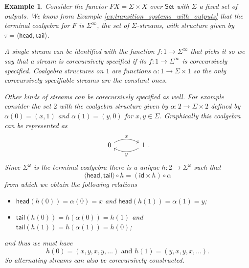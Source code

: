 \documentclass[letterpaper, 11pt, oneside]{memoir}
\theoremstyle{myteo}
\newtheorem{example}[theorem]{Example}
\numberwithin{equation}{section}
\newcommand{\id}{\textsf{id}}
\newcommand{\head}{\textsf{head}}
\newcommand{\tail}{\textsf{tail}}
\newcommand{\Set}{\textsf{Set}}
\newcommand{\intoprod}[2]{{\langle #1, #2\rangle}}
\begin{document}
\begin{example}
  Consider the functor \(FX = \Sigma \times X\) over \(\Set\) with \(\Sigma\) a fixed set of outputs.
  We know from Example \ref{ex:transition_systems_with_outputs} that the terminal coalgebra for \(F\) is \(\Sigma^\infty\), the set of \(\Sigma\)-streams, with structure given by \(\tau = \intoprod{\head}{\tail}\).

  A single stream can be identified with the function \(f : 1 \to \Sigma^\infty\) that picks it so we say that a stream is corecursively specified if its \(f : 1 \to \Sigma^\infty\) is corecursively specified.
  Coalgebra structures on \(1\) are functions \(\alpha: 1 \to \Sigma \times 1\) so the only corecursively specifiable streams are the constant ones.

  Other kinds of streams can be corecursively specified as well.
  For example consider the set \(2\) with the coalgebra structure given by \(\alpha : 2 \to \Sigma \times 2\) defined by \(\alpha(0) = (x, 1)\) and \(\alpha(1) = (y, 0)\) for \(x, y \in \Sigma\).
  Graphically this coalgebra can be represented as
  \begin{equation*}
    \begin{tikzcd}[sep = large]
      0 \ar[r, bend left, "x"] & 1 \ar[l, bend left, "y"]
    \end{tikzcd}.
  \end{equation*}
  Since \(\Sigma^\omega\) is the terminal coalgebra there is a unique \(h : 2 \to \Sigma^\omega\) such that
  \begin{equation*}
    \intoprod{\head}{\tail} \circ h = (\id \times h) \circ \alpha
  \end{equation*}
  from which we obtain the following relations
  \begin{itemize}
  \item[1.] \(\head(h(0)) = \alpha(0) = x\) and \(\head(h(1)) = \alpha(1) = y\);
  \item[2.] \(\tail(h(0)) = h(\alpha(0)) = h(1)\) and \(\tail(h(1)) = h(\alpha(1)) = h(0)\);
  \end{itemize}
  and thus we must have
  \begin{equation*}
    h(0) = (x, y, x, y, \ldots) \text{ and } h(1) = (y, x, y, x, \ldots).
  \end{equation*}
  So alternating streams can also be corecursively constructed.


\end{example}
\end{document}
